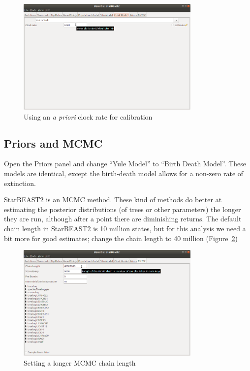 \documentclass[12pt]{article}
\begin{document}
\begin{figure}[htb!]
\centering
\includegraphics[width=0.8\textwidth]{figures/strictClockModel.png}
\caption
{Using an \textit{a priori} clock rate for calibration}
\label{fig:strictClockModel}
\end{figure}

\subsection{Priors and MCMC}
\label{subsec:MCMC}

Open the Priors panel and change ``Yule Model'' to ``Birth Death Model''.
These models are identical, except the birth-death model allows for a
non-zero rate of extinction.

StarBEAST2 is an MCMC method. These kind of methods do better at estimating
the posterior distributions (of trees or other parameters) the longer they
are run, although after a point there are diminishing returns. The default
chain length in StarBEAST2 is 10 million states, but for this analysis we
need a bit more for good estimates; change the chain length to 40 million
(Figure~\ref{fig:chainLength})

\begin{figure}[htb!]
\centering
\includegraphics[width=0.8\textwidth]{figures/chainLength.png}
\caption
{Setting a longer MCMC chain length}
\label{fig:chainLength}
\end{figure}
\end{document}
